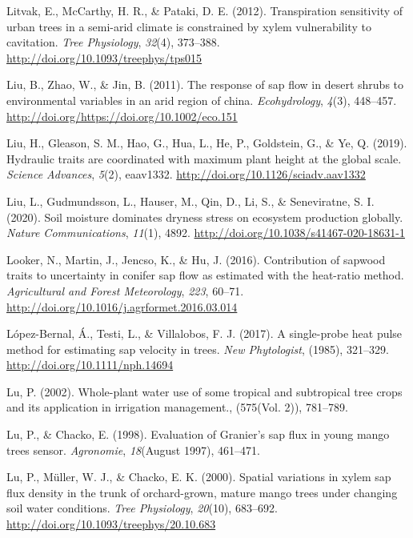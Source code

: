\documentclass[11pt,twoside]{reedthesis}
\begin{document}
\hypertarget{ref-litvak_transpiration_2012}{}
Litvak, E., McCarthy, H. R., \& Pataki, D. E. (2012). Transpiration
sensitivity of urban trees in a semi-arid climate is constrained by
xylem vulnerability to cavitation. \emph{Tree Physiology}, \emph{32}(4),
373--388. \url{http://doi.org/10.1093/treephys/tps015}

\hypertarget{ref-Liu2011}{}
Liu, B., Zhao, W., \& Jin, B. (2011). The response of sap flow in desert
shrubs to environmental variables in an arid region of china.
\emph{Ecohydrology}, \emph{4}(3), 448--457.
\url{http://doi.org/https://doi.org/10.1002/eco.151}

\hypertarget{ref-liu_hydraulic_2019}{}
Liu, H., Gleason, S. M., Hao, G., Hua, L., He, P., Goldstein, G., \& Ye,
Q. (2019). Hydraulic traits are coordinated with maximum plant height at
the global scale. \emph{Science Advances}, \emph{5}(2), eaav1332.
\url{http://doi.org/10.1126/sciadv.aav1332}

\hypertarget{ref-liu_soil_2020}{}
Liu, L., Gudmundsson, L., Hauser, M., Qin, D., Li, S., \& Seneviratne,
S. I. (2020). Soil moisture dominates dryness stress on ecosystem
production globally. \emph{Nature Communications}, \emph{11}(1), 4892.
\url{http://doi.org/10.1038/s41467-020-18631-1}

\hypertarget{ref-Looker2016}{}
Looker, N., Martin, J., Jencso, K., \& Hu, J. (2016). Contribution of
sapwood traits to uncertainty in conifer sap flow as estimated with the
heat-ratio method. \emph{Agricultural and Forest Meteorology},
\emph{223}, 60--71. \url{http://doi.org/10.1016/j.agrformet.2016.03.014}

\hypertarget{ref-Lopez-Bernal2017}{}
López-Bernal, Á., Testi, L., \& Villalobos, F. J. (2017). A single-probe
heat pulse method for estimating sap velocity in trees. \emph{New
Phytologist}, (1985), 321--329. \url{http://doi.org/10.1111/nph.14694}

\hypertarget{ref-Lu2002}{}
Lu, P. (2002). Whole-plant water use of some tropical and subtropical
tree crops and its application in irrigation management., (575(Vol. 2)),
781--789.

\hypertarget{ref-Lu1998}{}
Lu, P., \& Chacko, E. (1998). Evaluation of Granier's sap flux in young
mango trees sensor. \emph{Agronomie}, \emph{18}(August 1997), 461--471.

\hypertarget{ref-Lu2000}{}
Lu, P., Müller, W. J., \& Chacko, E. K. (2000). Spatial variations in
xylem sap flux density in the trunk of orchard-grown, mature mango trees
under changing soil water conditions. \emph{Tree Physiology},
\emph{20}(10), 683--692. \url{http://doi.org/10.1093/treephys/20.10.683}
\end{document}
